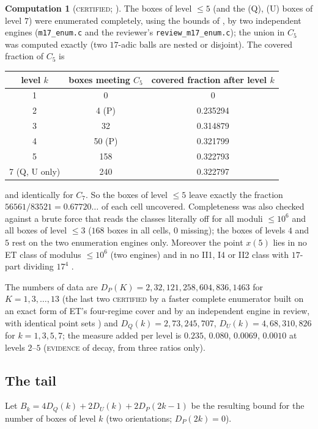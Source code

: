\documentclass[11pt,reqno]{amsart}
\theoremstyle{definition}
\newtheorem{computation}[theorem]{Computation}
\newcommand{\status}[1]{\textup{\textsc{#1}}}
\begin{document}
\begin{computation}[\status{certified}; {\cite[Comp.~3.1]{PM17}}]\label{comp:17}
The boxes of level $\le5$ (and the (Q), (U) boxes of level $7$) were
enumerated completely, using the bounds of \cite[Lemma~2.8]{ET}, by two
independent engines (\texttt{m17\_enum.c} and the reviewer's
\texttt{review\_m17\_enum.c}); the union in $C_5$ was computed exactly
(two $17$-adic balls are nested or disjoint).  The covered fraction of
$C_5$ is
\begin{center}
\begin{tabular}{ccc}
\toprule
level $k$ & boxes meeting $C_5$ & covered fraction after level $k$\\
\midrule
1 & 0 & 0\\
2 & 4 (P) & 0.235294\\
3 & 32 & 0.314879\\
4 & 50 (P) & 0.321799\\
5 & 158 & 0.322793\\
7 (Q, U only) & 240 & 0.322797\\
\bottomrule
\end{tabular}
\end{center}
and identically for $C_7$.  So the boxes of level $\le5$ leave exactly
the fraction $56561/83521=0.67720\ldots$ of each cell uncovered.
Completeness was also checked against a brute force that reads the
classes literally off \cite[Prop.~1.9]{ET} for all moduli $\le10^6$ and
all boxes of level $\le3$ ($168$ boxes in all cells, $0$ missing); the boxes of levels
$4$ and $5$ rest on the two enumeration engines only.  Moreover the point $x(5)$ lies in no ET class of modulus
$\le10^6$ (two engines) and in no II1, I4 or II2 class with $17$-part
dividing $17^4$ \cite[Comp.~5.1]{PM}.
\end{computation}

The numbers of data are $D_P(K)=2,32,121,258,604,836,1463$ for
$K=1,3,\dots,13$ (the last two \status{certified} by a faster complete
enumerator built on an exact form of ET's four-regime cover and by an
independent engine in review, with identical point sets \cite[\S2]{PM17B}) and
$D_Q(k)=2,73,245,707$, $D_U(k)=4,68,310,826$ for $k=1,3,5,7$; the measure
added per level is $0.235$, $0.080$, $0.0069$, $0.0010$ at levels $2$--$5$
(\status{evidence} of decay, from three ratios only).

\subsection{The tail}
Let $B_k=4D_Q(k)+2D_U(k)+2D_P(2k-1)$ be the resulting bound for the
number of boxes of level $k$ (two orientations; $D_P(2k)=0$).
\end{document}
